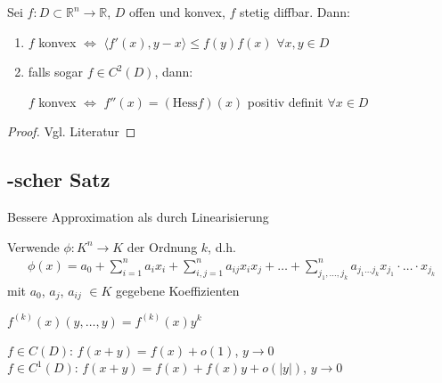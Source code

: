 \begin{proposition}
	Sei $f:D\subset\mathbb{R}^n\to\mathbb{R}$, $D$ offen und konvex, $f$ stetig \gls{diffbar}. Dann:\begin{enumerate}[label={\alph*)}]
		\item $f$ konvex $\Leftrightarrow$ $\langle f'(x), y- x\rangle \le f(y)f(x)$ $\forall x,y\in D$
		\item falls sogar $f\in C^2(D)$, dann: \begin{center}
				$f$ konvex $\Leftrightarrow$ $f''(x) = (\mathrm{Hess} f)(x)$ positiv definit $\forall x\in D$
		\end{center}
	\end{enumerate}
\end{proposition}
\begin{proof}
	Vgl. Literatur
\end{proof}

\subsection{-scher Satz}
\begin{underlinedenvironment}[Ziel]
	Bessere Approximation als durch Linearisierung
\end{underlinedenvironment}

Verwende  $\phi:K^n\to K$ der Ordnung $k$, d.h. \begin{align}
	\phi(x) = a_0 + \sum_{i=1}^n a_i x_i + \sum_{i,j=1}^n a_{ij} x_i x_j + \dotsc + \sum_{j_1,\dotsc,j_k}^n a_{j_1\dots j_k} x_{j_1}\cdot\dots\cdot x_{j_k}
\end{align}
mit $a_0$, $a_j$, $a_{ij}$ $\in K$ gegebene Koeffizienten

\begin{underlinedenvironment}[Notation]
	$f^{(k)}(x)(y,\dotsc,y) = f^{(k)}(x) y^k$
\end{underlinedenvironment}
\begin{underlinedenvironment}[Wdh]
	$f\in C(D)$: $f(x+y) = f(x) + o(1)$, $y\to 0$ \\
	$f\in C^1(D)$: $f(x+y) = f(x) + f(x)y + o(\vert y \vert)$, $y\to 0$
\end{underlinedenvironment}

